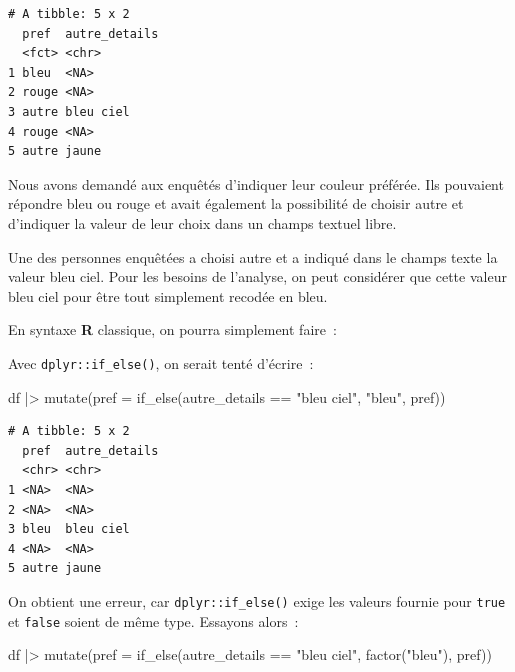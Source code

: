 \documentclass[
  letterpaper,
  DIV=11,
  numbers=noendperiod,
  oneside]{scrreprt}
\newenvironment{Shaded}{\begin{snugshade}}{\end{snugshade}}
\newcommand{\AttributeTok}[1]{\textcolor[rgb]{0.40,0.45,0.13}{#1}}
\newcommand{\FunctionTok}[1]{\textcolor[rgb]{0.28,0.35,0.67}{#1}}
\newcommand{\NormalTok}[1]{\textcolor[rgb]{0.00,0.23,0.31}{#1}}
\newcommand{\OtherTok}[1]{\textcolor[rgb]{0.00,0.23,0.31}{#1}}
\newcommand{\SpecialCharTok}[1]{\textcolor[rgb]{0.37,0.37,0.37}{#1}}
\newcommand{\StringTok}[1]{\textcolor[rgb]{0.13,0.47,0.30}{#1}}
\begin{document}
\begin{verbatim}
# A tibble: 5 x 2
  pref  autre_details
  <fct> <chr>        
1 bleu  <NA>         
2 rouge <NA>         
3 autre bleu ciel    
4 rouge <NA>         
5 autre jaune        
\end{verbatim}

Nous avons demandé aux enquêtés d'indiquer leur couleur préférée. Ils
pouvaient répondre bleu ou rouge et avait également la possibilité de
choisir autre et d'indiquer la valeur de leur choix dans un champs
textuel libre.

Une des personnes enquêtées a choisi autre et a indiqué dans le champs
texte la valeur bleu ciel. Pour les besoins de l'analyse, on peut
considérer que cette valeur bleu ciel pour être tout simplement recodée
en bleu.

En syntaxe \textbf{R} classique, on pourra simplement faire~:

\begin{Shaded}
\end{Shaded}

Avec \texttt{dplyr::if\_else()}, on serait tenté d'écrire~:

\begin{Shaded}
\begin{Highlighting}[]
\NormalTok{df }\SpecialCharTok{|\textgreater{}} 
  \FunctionTok{mutate}\NormalTok{(}\AttributeTok{pref =} \FunctionTok{if\_else}\NormalTok{(autre\_details }\SpecialCharTok{==} \StringTok{"bleu ciel"}\NormalTok{, }\StringTok{"bleu"}\NormalTok{, pref))}
\end{Highlighting}
\end{Shaded}

\begin{verbatim}
# A tibble: 5 x 2
  pref  autre_details
  <chr> <chr>        
1 <NA>  <NA>         
2 <NA>  <NA>         
3 bleu  bleu ciel    
4 <NA>  <NA>         
5 autre jaune        
\end{verbatim}

On obtient une erreur, car \texttt{dplyr::if\_else()} exige les valeurs
fournie pour \texttt{true} et \texttt{false} soient de même type.
Essayons alors~:

\begin{Shaded}
\begin{Highlighting}[]
\NormalTok{df }\SpecialCharTok{|\textgreater{}} 
  \FunctionTok{mutate}\NormalTok{(}\AttributeTok{pref =} \FunctionTok{if\_else}\NormalTok{(autre\_details }\SpecialCharTok{==} \StringTok{"bleu ciel"}\NormalTok{, }\FunctionTok{factor}\NormalTok{(}\StringTok{"bleu"}\NormalTok{), pref))}
\end{Highlighting}
\end{Shaded}
\end{document}
